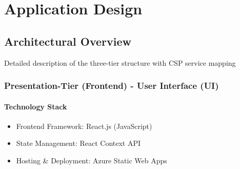 \documentclass{llncs}
\begin{document}
\section{Application Design}
\subsection{Architectural Overview}
Detailed description of the three-tier structure with CSP service mapping
\subsubsection{Presentation-Tier (Frontend) - User Interface (UI)}
\paragraph{Technology Stack}
\begin{itemize}
    \item Frontend Framework: React.js (JavaScript)
    \item State Management: React Context API
    \item Hosting \& Deployment: Azure Static Web Apps
\end{itemize}
\end{document}
